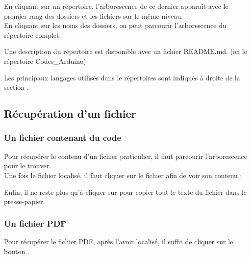 {En cliquant sur un répertoire, l'arborescence de ce dernier apparaît avec le premier rang des dossiers et les fichiers sur le même niveau.\\
En cliquant sur les noms des dossiers, on peut parcourir l'arborescence du répertoire complet.\\


Une description du répertoire est disponible avec un fichier README.md. (ici le répertoire Codes\_Arduino)


Les principaux langages utilisés dans le répertoires sont indiqués à droite de la section .

\subsection{Récupération d'un fichier}

\subsubsection{Un fichier contenant du code}
Pour récupérer le contenu  d'un fichier particulier, il faut parcourir l'arborescence pour le trouver.\\
Une fois le fichier localisé, il faut cliquer sur le fichier afin de voir son contenu : 



Enfin, il ne reste plus qu'à cliquer sur 
pour copier tout le texte du fichier dans le presse-papier.



\subsubsection{Un fichier PDF}

Pour récupérer le fichier PDF, après l'avoir localisé, il suffit de cliquer sur le bouton .




}
